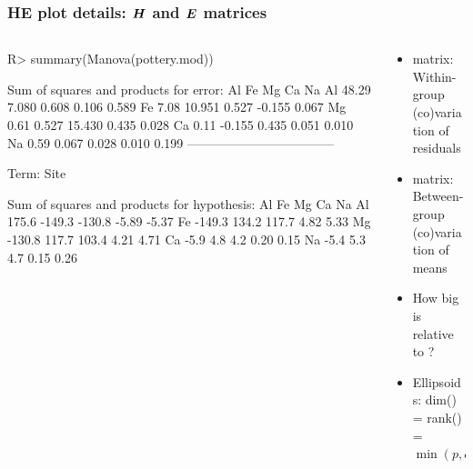 \begin{frame}
	\frametitle{HE plot details: $\bm{H}$ and $\bm{E}$ matrices}
\begin{columns}[t]
 \begin{column}{0.55\textwidth}
\begin{CodeInput}
R> summary(Manova(pottery.mod))
\end{CodeInput}
\begin{CodeOutput}[fontsize=\footnotesize,baselinestretch=0.8]
Sum of squares and products for error:
      Al     Fe     Mg     Ca    Na
Al 48.29  7.080  0.608  0.106 0.589
Fe  7.08 10.951  0.527 -0.155 0.067
Mg  0.61  0.527 15.430  0.435 0.028
Ca  0.11 -0.155  0.435  0.051 0.010
Na  0.59  0.067  0.028  0.010 0.199
-----------------------------------
 
Term: Site 

Sum of squares and products for hypothesis:
       Al     Fe     Mg    Ca    Na
Al  175.6 -149.3 -130.8 -5.89 -5.37
Fe -149.3  134.2  117.7  4.82  5.33
Mg -130.8  117.7  103.4  4.21  4.71
Ca   -5.9    4.8    4.2  0.20  0.15
Na   -5.4    5.3    4.7  0.15  0.26
\end{CodeOutput} 
 \end{column}
 \begin{column}{0.45\textwidth}
 	\begin{itemize}
 		\item {} matrix:  Within-group (co)variation of residuals
 		\item {} matrix:  Between-group (co)variation of means
 		\item How big is  relative to ?
 	  \item Ellipsoids: dim() = rank() = $\min( p, df_h)$
  \end{itemize}
 \end{column}
\end{columns}

\end{frame}

